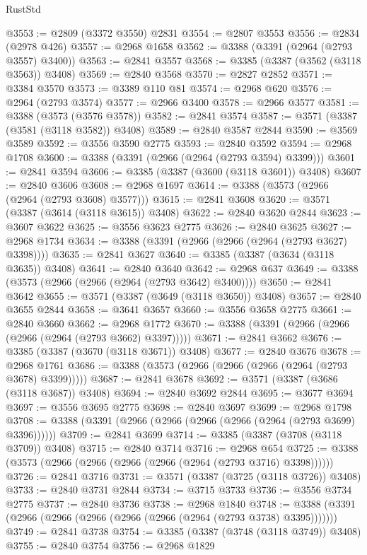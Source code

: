 \begin{lexlean}{RustStd}
\begin{coremodule}
@3553 := @2809 (@3372 @3550) @2831
@3554 := @2807 @3553
@3556 := @2834 (@2978 @426)
@3557 := @2968 @1658
@3562 := @3388 (@3391 (@2964 (@2793 @3557) @3400))
@3563 := @2841 @3557
@3568 := @3385 (@3387 (@3562 (@3118 @3563)) @3408)
@3569 := @2840 @3568
@3570 := @2827 @2852
@3571 := @3384 @3570
@3573 := @3389 @110 @81
@3574 := @2968 @620
@3576 := @2964 (@2793 @3574)
@3577 := @2966 @3400
@3578 := @2966 @3577
@3581 := @3388 (@3573 (@3576 @3578))
@3582 := @2841 @3574
@3587 := @3571 (@3387 (@3581 (@3118 @3582)) @3408)
@3589 := @2840 @3587 @2844
@3590 := @3569 @3589
@3592 := @3556 @3590 @2775
@3593 := @2840 @3592
@3594 := @2968 @1708
@3600 := @3388 (@3391 (@2966 (@2964 (@2793 @3594) @3399)))
@3601 := @2841 @3594
@3606 := @3385 (@3387 (@3600 (@3118 @3601)) @3408)
@3607 := @2840 @3606
@3608 := @2968 @1697
@3614 := @3388 (@3573 (@2966 (@2964 (@2793 @3608) @3577)))
@3615 := @2841 @3608
@3620 := @3571 (@3387 (@3614 (@3118 @3615)) @3408)
@3622 := @2840 @3620 @2844
@3623 := @3607 @3622
@3625 := @3556 @3623 @2775
@3626 := @2840 @3625
@3627 := @2968 @1734
@3634 := @3388 (@3391 (@2966 (@2966 (@2964 (@2793 @3627) @3398))))
@3635 := @2841 @3627
@3640 := @3385 (@3387 (@3634 (@3118 @3635)) @3408)
@3641 := @2840 @3640
@3642 := @2968 @637
@3649 := @3388 (@3573 (@2966 (@2966 (@2964 (@2793 @3642) @3400))))
@3650 := @2841 @3642
@3655 := @3571 (@3387 (@3649 (@3118 @3650)) @3408)
@3657 := @2840 @3655 @2844
@3658 := @3641 @3657
@3660 := @3556 @3658 @2775
@3661 := @2840 @3660
@3662 := @2968 @1772
@3670 := @3388 (@3391 (@2966 (@2966 (@2966 (@2964 (@2793 @3662) @3397)))))
@3671 := @2841 @3662
@3676 := @3385 (@3387 (@3670 (@3118 @3671)) @3408)
@3677 := @2840 @3676
@3678 := @2968 @1761
@3686 := @3388 (@3573 (@2966 (@2966 (@2966 (@2964 (@2793 @3678) @3399)))))
@3687 := @2841 @3678
@3692 := @3571 (@3387 (@3686 (@3118 @3687)) @3408)
@3694 := @2840 @3692 @2844
@3695 := @3677 @3694
@3697 := @3556 @3695 @2775
@3698 := @2840 @3697
@3699 := @2968 @1798
@3708 := @3388 (@3391 (@2966 (@2966 (@2966 (@2966 (@2964 (@2793 @3699) @3396))))))
@3709 := @2841 @3699
@3714 := @3385 (@3387 (@3708 (@3118 @3709)) @3408)
@3715 := @2840 @3714
@3716 := @2968 @654
@3725 := @3388 (@3573 (@2966 (@2966 (@2966 (@2966 (@2964 (@2793 @3716) @3398))))))
@3726 := @2841 @3716
@3731 := @3571 (@3387 (@3725 (@3118 @3726)) @3408)
@3733 := @2840 @3731 @2844
@3734 := @3715 @3733
@3736 := @3556 @3734 @2775
@3737 := @2840 @3736
@3738 := @2968 @1840
@3748 := @3388 (@3391 (@2966 (@2966 (@2966 (@2966 (@2966 (@2964 (@2793 @3738) @3395)))))))
@3749 := @2841 @3738
@3754 := @3385 (@3387 (@3748 (@3118 @3749)) @3408)
@3755 := @2840 @3754
@3756 := @2968 @1829

\end{coremodule}
\end{lexlean}
